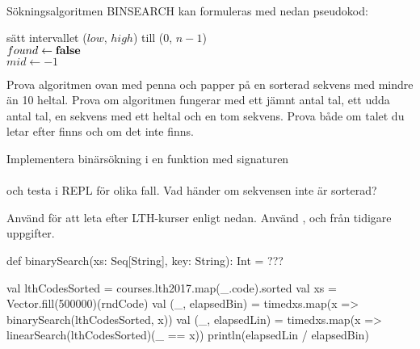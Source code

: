 \QUESTEND







\QUESTBEGIN

\Task  \what~  \\Sökningsalgoritmen BINSEARCH kan formuleras med nedan pseudokod:

\begin{algorithm}[H]

 sätt intervallet ($low$, $high$) till ($0$, $n - 1$) \\
 $found \leftarrow \bf{false}$ \\
 $mid \leftarrow -1$\\
\end{algorithm}

\Subtask Prova algoritmen ovan med penna och papper på en sorterad sekvens med mindre än 10 heltal. Prova om algoritmen fungerar med ett jämnt antal tal, ett udda antal tal, en sekvens med ett heltal och en tom sekvens. Prova både om talet du letar efter finns och om det inte finns.

\Subtask Implementera binärsökning i en funktion med signaturen\\
\\
och testa i REPL för olika fall. Vad händer om sekvensen inte är sorterad?

\Subtask Använd  för att leta efter LTH-kurser enligt nedan. Använd ,  och  från tidigare uppgifter.
\begin{Code}
def binarySearch(xs: Seq[String], key: String): Int = ???

val lthCodesSorted = courses.lth2017.map(_.code).sorted
val xs = Vector.fill(500000)(rndCode)
val (_, elapsedBin) =
  timed{xs.map(x => binarySearch(lthCodesSorted, x))}
val (_, elapsedLin) =
  timed{xs.map(x => linearSearch(lthCodesSorted)(_ == x))}
println(elapsedLin / elapsedBin)
\end{Code}


